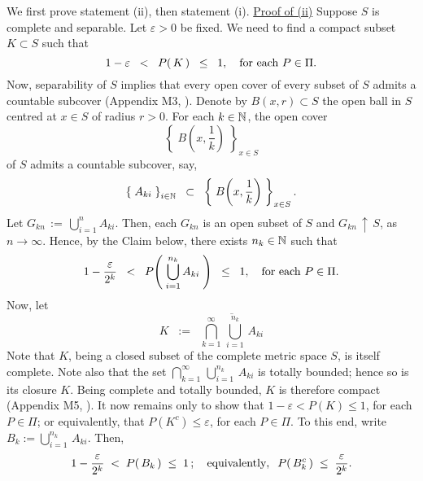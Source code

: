 \proof We first prove statement (ii), then statement (i).
\vskip 0.3cm
\noindent
\underline{Proof of (ii)}
\vskip 0.2cm
\noindent
Suppose $S$ is complete and separable.
Let $\varepsilon > 0$ be fixed.
We need to find a compact subset $K \subset S$ such that
\begin{equation*}
1 - \varepsilon \;\; < \;\; P\!\left(\,K\,\right) \;\; \leq \;\; 1,
\quad\textnormal{for each $P \in \Pi$}.
\end{equation*}
Now, separability of $S$ implies that every open cover of every subset of $S$
admits a countable subcover (Appendix M3, \cite{Billingsley1999}).
Denote by $B(x,r) \subset S$ the open ball in $S$ centred at $x \in S$ of radius $r > 0$.
For each $k \in \mathbb{N}$, the open cover
\begin{equation*}
\left\{\;B\!\left(x,\dfrac{1}{k}\right)\;\right\}_{x \in S}
\end{equation*}
of $S$ admits a countable subcover, say,
\begin{equation*}
\left\{\;A_{ki}\;\right\}_{i\in\mathbb{N}}
\;\;\subset\;\;
\left\{\;B\!\left(x,\dfrac{1}{k}\right)\;\right\}_{x \in S}.
\end{equation*}
Let $G_{kn} \,:=\, \bigcup_{i=1}^{n}A_{ki}$.
Then, each $G_{kn}$ is an open subset of $S$ and
$G_{kn}\,\uparrow\,S$, as $n\longrightarrow\infty$.
Hence, by the Claim below, there exists $n_{k} \in \mathbb{N}$ such that
\begin{equation*}
1 - \dfrac{\varepsilon}{2^{k}} \;\; < \;\; P\!\left(\;\bigcup_{i=1}^{n_{k}} A_{ki}\;\right)\;\; \leq \;\; 1,
\quad\textnormal{for each $P \in \Pi$}.
\end{equation*}
Now, let
\begin{equation*}
K \;\; := \;\;
\overline{\bigcap_{k=1}^{\infty}\,\bigcup_{i=1}^{n_{k}}\,A_{ki}}
\end{equation*}
Note that $K$, being a closed subset of the complete metric space $S$, is itself complete.
Note also that the set $\bigcap_{k=1}^{\infty}\,\bigcup_{i=1}^{n_{k}}\,A_{ki}$ is totally bounded;
hence so is its closure $K$.
Being complete and totally bounded, $K$ is therefore compact (Appendix M5, \cite{Billingsley1999}).
It now remains only to show that $1 - \varepsilon < P(K) \leq 1$, for each $P \in \Pi$;
or equivalently, that $P(K^{c}) \leq \varepsilon$, for each $P \in \Pi$.
To this end, write $B_{k} := \bigcup_{i=1}^{n_{k}}\,A_{ki}$.
Then,
\begin{equation*}
1 - \dfrac{\varepsilon}{2^{k}} \;<\; P\!\left(\,B_{k}\,\right) \;\leq\; 1\,;
\quad\textnormal{equivalently},\;\;
P\!\left(\,B_{k}^{c}\,\right) \;\leq\; \dfrac{\varepsilon}{2^{k}}.
\end{equation*}
